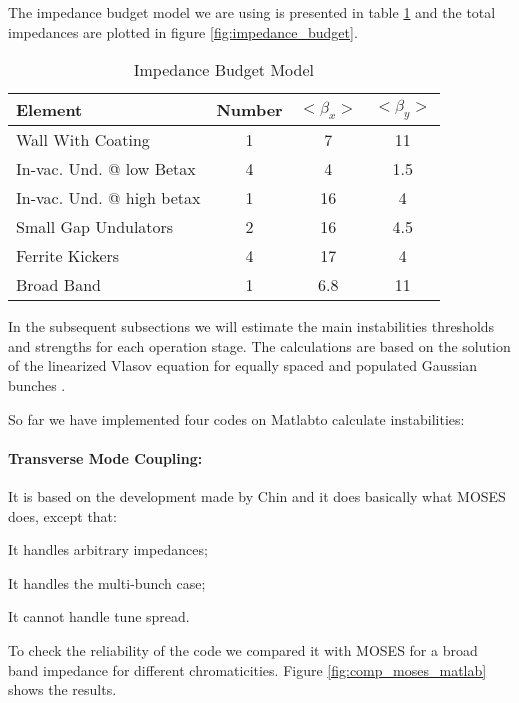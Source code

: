The impedance budget model we are using is presented in table \ref{tab:impedance_budget} and the total impedances are plotted in figure \ref{fig:impedance_budget}.

\begin{table}[!ht]
 \centering
 \caption{Impedance Budget Model}
 \label{tab:impedance_budget}
 \begin{tabular}{lccc}
 Element                  &  Number  & $<\beta_x>$ & $<\beta_y>$ \\\hline
Wall With Coating         & 1        &   7         &   11        \\\hline  
In-vac. Und. @ low Betax  & 4        &       4     &       1.5   \\\hline      
In-vac. Und. @ high betax & 1        &         16  &         4   \\\hline        
Small Gap Undulators      & 2        &        16   &        4.5 \\\hline       
Ferrite Kickers           &   4      &       17    &       4   \\\hline        
Broad Band                &    1     &      6.8    &      11   \\\hline       
\end{tabular}
\end{table}


In the subsequent subsections we will estimate the main instabilities thresholds and strengths for each operation stage. The calculations are based on the solution of the linearized Vlasov equation for equally spaced and populated Gaussian bunches \cite{Chao1993, chin1985, cai2011}.

So far we have implemented four codes on Matlab\textregistered to calculate instabilities:
 \paragraph{Transverse Mode Coupling:} It is based on the development made by Chin \cite{chin1985} and it does basically what MOSES \cite{moses1986} does, except that:
 \begin{description}
  \item It handles arbitrary impedances;
  \item It handles the multi-bunch case;
  \item It cannot handle tune spread.
 \end{description}
To check the reliability of the code we compared it with MOSES for a broad band impedance for different chromaticities. Figure \ref{fig:comp_moses_matlab} shows the results.

